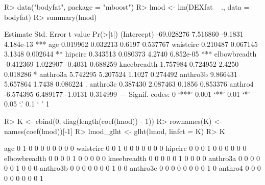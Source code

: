 \documentclass[landscape]{slides}
\begin{document}
\begin{Schunk}
\begin{Sinput}
R> data("bodyfat", package = "mboost")
R> lmod <- lm(DEXfat ~ ., data = bodyfat)
R> summary(lmod)
\end{Sinput}
\end{Schunk}
\begin{Schunk}
\begin{Soutput}
               Estimate Std. Error t value  Pr(>|t|)    
(Intercept)  -69.028276   7.516860 -9.1831 4.184e-13 ***
age            0.019962   0.032213  0.6197  0.537767    
waistcirc      0.210487   0.067145  3.1348  0.002644 ** 
hipcirc        0.343513   0.080373  4.2740 6.852e-05 ***
elbowbreadth  -0.412369   1.022907 -0.4031  0.688259    
kneebreadth    1.757984   0.724952  2.4250  0.018286 *  
anthro3a       5.742295   5.207524  1.1027  0.274492    
anthro3b       9.866431   5.657864  1.7438  0.086224 .  
anthro3c       0.387430   2.087463  0.1856  0.853376    
anthro4       -6.574395   6.489177 -1.0131  0.314999    
---
Signif. codes:  0 ‘***’ 0.001 ‘**’ 0.01 ‘*’ 0.05 ‘.’ 0.1 ‘ ’ 1 
\end{Soutput}
\end{Schunk}



\begin{Schunk}
\begin{Sinput}
R> K <- cbind(0, diag(length(coef(lmod)) - 1))
R> rownames(K) <- names(coef(lmod))[-1]
R> lmod_glht <- glht(lmod, linfct = K) 
R> K
\end{Sinput}
\begin{Soutput}
             [,1] [,2] [,3] [,4] [,5] [,6] [,7] [,8] [,9] [,10]
age             0    1    0    0    0    0    0    0    0     0
waistcirc       0    0    1    0    0    0    0    0    0     0
hipcirc         0    0    0    1    0    0    0    0    0     0
elbowbreadth    0    0    0    0    1    0    0    0    0     0
kneebreadth     0    0    0    0    0    1    0    0    0     0
anthro3a        0    0    0    0    0    0    1    0    0     0
anthro3b        0    0    0    0    0    0    0    1    0     0
anthro3c        0    0    0    0    0    0    0    0    1     0
anthro4         0    0    0    0    0    0    0    0    0     1
\end{Soutput}
\end{Schunk}

\end{document}
